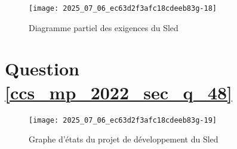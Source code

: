 \begin{figure}[!h]
\centering
\texttt{[image: 2025\_07\_06\_ec63d2f3afc18cdeeb83g-18]}

\caption{\label{ccs_mp_2022_fig_A}Diagramme partiel des exigences du Sled}
\end{figure}

\section*{Question \ref{ccs_mp_2022_sec_q_48}}
\begin{figure}[!h]
\centering

\texttt{[image: 2025\_07\_06\_ec63d2f3afc18cdeeb83g-19]}

\caption{\label{ccs_mp_2022_fig_B}Graphe d'états du projet de développement du Sled}
\end{figure}

